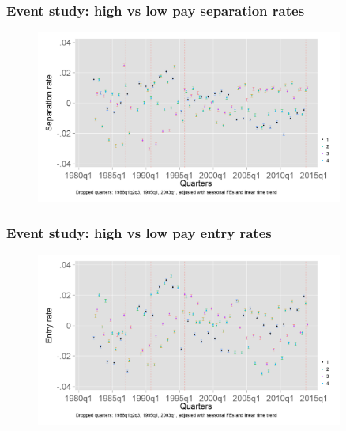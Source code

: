 \documentclass[aspectratio=169]{beamer}
\begin{document}
\begin{frame}
    \frametitle{Event study: high vs low pay separation rates}

    \begin{figure}[]
        \centering
        \includegraphics[width=0.9\textwidth]{../output/separation_rate_med_pay.png}
    \end{figure}

\end{frame}

\begin{frame}
    \frametitle{Event study: high vs low pay entry rates}

    \begin{figure}[]
        \centering
        \includegraphics[width=0.9\textwidth]{../output/accession_rate_med_pay.png}
    \end{figure}

\end{frame}
\end{document}
